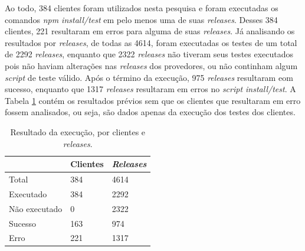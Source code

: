 

Ao todo, 384 clientes foram utilizados nesta pesquisa e foram executadas os comandos \textit{npm install/test} em pelo menos uma de suas \textit{releases}. Desses 384 clientes, 221 resultaram em erros para alguma de suas \textit{releases}. Já analisando os resultados por \textit{releases}, de todas as 4614, foram executadas os testes de um total de 2292 \textit{releases}, enquanto que 2322 \textit{releases} não tiveram seus testes executados pois não haviam alterações nas \textit{releases} dos provedores, ou não continham algum \textit{script} de teste válido. Após o término da execução, 975 \textit{releases} resultaram eom sucesso, enquanto que 1317 \textit{releases} resultaram em erros no \textit{script install/test}. A Tabela \ref{tab:res_rq1_1} contém os resultados prévios sem que os clientes que resultaram em erro fossem analisados, ou seja, são dados apenas da execução dos testes dos clientes.

\begin{table}[]
\centering
\begin{tabular}{|l|l|l|}
\hline
                    & Clientes & \textit{Releases} \\ \hline
    Total           & 384     & 4614     \\
    Executado       & 384     & 2292     \\
    Não executado   & 0       & 2322     \\
    Sucesso         & 163     & 974     \\
    Erro            & 221     & 1317     \\ \hline
\end{tabular}
\caption{Resultado da execução, por clientes e \textit{releases}.}
\label{tab:res_rq1_1}
\end{table}

